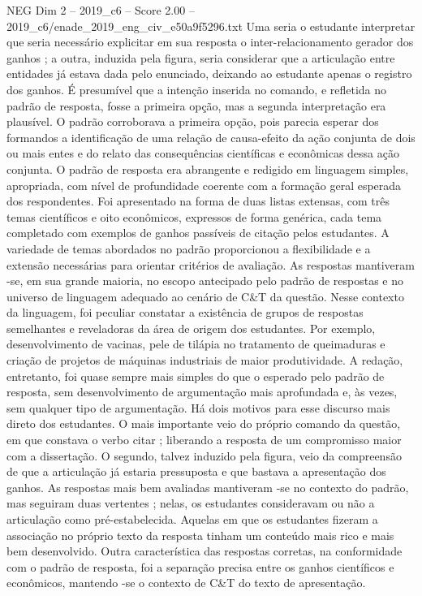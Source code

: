 \begin{textsample}{NEG Dim 2 – 2019\_c6 – Score 2.00 – 2019\_c6/enade\_2019\_eng\_civ\_e50a9f5296.txt}
Uma seria o estudante interpretar que seria necessário explicitar em sua resposta o inter-relacionamento gerador dos ganhos ; a outra, induzida pela figura, seria considerar que a articulação entre entidades já estava dada pelo enunciado, deixando ao estudante apenas o registro dos ganhos.
É presumível que a intenção inserida no comando, e refletida no padrão de resposta, fosse a primeira opção, mas a segunda interpretação era plausível.
O padrão corroborava a primeira opção, pois parecia esperar dos formandos a identificação de uma relação de causa-efeito da ação conjunta de dois ou mais entes e do relato das consequências científicas e econômicas dessa ação conjunta.
O padrão de resposta era abrangente e redigido em linguagem simples, apropriada, com nível de profundidade coerente com a formação geral esperada dos respondentes.
Foi apresentado na forma de duas listas extensas, com três temas científicos e oito econômicos, expressos de forma genérica, cada tema completado com exemplos de ganhos passíveis de citação pelos estudantes.
A variedade de temas abordados no padrão proporcionou a flexibilidade e a extensão necessárias para orientar critérios de avaliação.
As respostas mantiveram -se, em sua grande maioria, no escopo antecipado pelo padrão de respostas e no universo de linguagem adequado ao cenário de C\&T da questão.
Nesse contexto da linguagem, foi peculiar constatar a existência de grupos de respostas semelhantes e reveladoras da área de origem dos estudantes.
Por exemplo, desenvolvimento de vacinas, pele de tilápia no tratamento de queimaduras e criação de projetos de máquinas industriais de maior produtividade.
A redação, entretanto, foi quase sempre mais simples do que o esperado pelo padrão de resposta, sem desenvolvimento de argumentação mais aprofundada e, às vezes, sem qualquer tipo de argumentação.
Há dois motivos para esse discurso mais direto dos estudantes.
O mais importante veio do próprio comando da questão, em que constava o verbo citar ; liberando a resposta de um compromisso maior com a dissertação.
O segundo, talvez induzido pela figura, veio da compreensão de que a articulação já estaria pressuposta e que bastava a apresentação dos ganhos.
As respostas mais bem avaliadas mantiveram -se no contexto do padrão, mas seguiram duas vertentes ; nelas, os estudantes consideravam ou não a articulação como pré-estabelecida.
Aquelas em que os estudantes fizeram a associação no próprio texto da resposta tinham um conteúdo mais rico e mais bem desenvolvido.
Outra característica das respostas corretas, na conformidade com o padrão de resposta, foi a separação precisa entre os ganhos científicos e econômicos, mantendo -se o contexto de C\&T do texto de apresentação.

\end{textsample}
